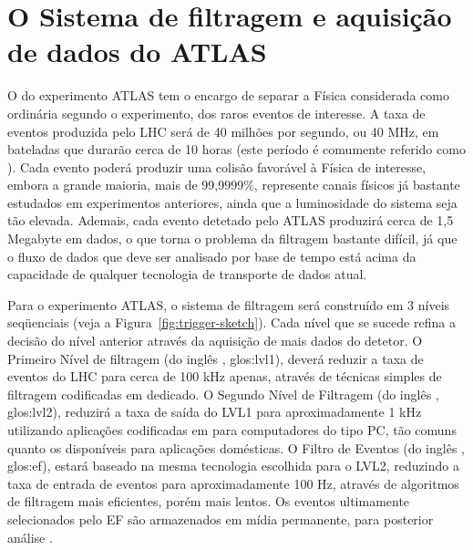 \typeout{ ====================================================================}
\typeout{ ====================================================================}

\chapter{O Sistema de filtragem e aquisição de dados do ATLAS}
\label{chap:trigger}

O  do experimento ATLAS tem o encargo de separar
 a Física considerada como ordinária segundo o experimento, dos
raros eventos de interesse. A taxa de eventos produzida pelo LHC será de 40
milhões por segundo, ou 40 MHz, em bateladas que durarão cerca de 10 horas
(este período é comumente referido como ). Cada evento poderá
produzir uma colisão favorável à Física de interesse, embora a grande maioria,
mais de 99,9999\%, represente canais físicos já bastante estudados em
experimentos anteriores, ainda que a luminosidade do sistema seja tão
elevada. Ademais, cada evento detetado pelo ATLAS produzirá cerca de 1,5
Megabyte em dados, o que torna o problema da filtragem bastante difícil, já
que o fluxo de dados que deve ser analisado por base de tempo está acima da
capacidade de qualquer tecnologia de transporte de dados atual.

Para o experimento ATLAS, o sistema de filtragem será construído em 3 níveis
seqüenciais (veja a Figura~\ref{fig:trigger-sketch}). Cada nível que se sucede
refina a decisão do nível anterior através da aquisição de mais dados do
detetor. O Primeiro Nível de filtragem (do inglês ,
\gls{glos:lvl1}), deverá reduzir a taxa de eventos do LHC para cerca de 100
kHz apenas, através de técnicas simples de filtragem codificadas em
 dedicado. O Segundo Nível de Filtragem (do inglês
, \gls{glos:lvl2}), reduzirá a taxa de saída do LVL1 para
aproximadamente 1 kHz utilizando aplicações codificadas em
 para computadores do tipo PC, tão comuns quanto os disponíveis
para aplicações domésticas. O Filtro de Eventos (do inglês ,
\gls{glos:ef}), estará baseado na mesma tecnologia escolhida para o LVL2,
reduzindo a taxa de entrada de eventos para aproximadamente 100 Hz, através de
algoritmos de filtragem mais eficientes, porém mais lentos. Os eventos
ultimamente selecionados pelo EF são armazenados em mídia permanente, para
posterior análise . 

